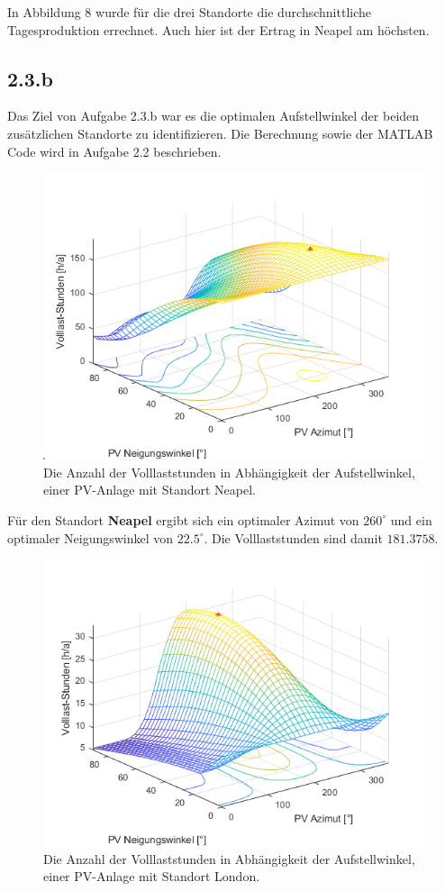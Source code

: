 \documentclass[a4paper,12pt]{article}
\begin{document}
	In Abbildung 8 wurde für die drei Standorte die durchschnittliche Tagesproduktion errechnet. Auch hier ist der Ertrag in Neapel am höchsten.
	\subsection{2.3.b}
	Das Ziel von Aufgabe 2.3.b war es die optimalen Aufstellwinkel der beiden zusätzlichen Standorte zu identifizieren.\newline
	Die Berechnung sowie der MATLAB Code wird in Aufgabe 2.2 beschrieben.
	\begin{figure}[H]
		\centering
		\includegraphics[width=12cm]{img/results/VolllaststundenAbhaengigVomWinkelNeapel}
		\caption{Die Anzahl der Volllaststunden in Abhängigkeit der Aufstellwinkel, einer PV-Anlage mit Standort Neapel.}
	\end{figure}
	Für den Standort \textbf{Neapel} ergibt sich ein optimaler Azimut von $260^{\circ}$ und ein optimaler Neigungswinkel von $22.5^{\circ}$. Die Volllaststunden sind damit $181.3758$.
	\begin{figure}[H]
		\centering
		\includegraphics[width=12cm]{img/results/VolllaststundenAbhaengigVomWinkelLondon}
		\caption{Die Anzahl der Volllaststunden in Abhängigkeit der Aufstellwinkel, einer PV-Anlage mit Standort London.}
	\end{figure}
\end{document}
